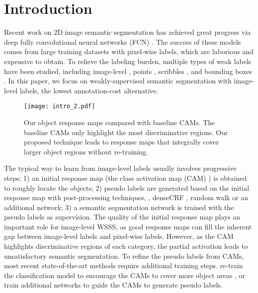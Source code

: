 \documentclass[10pt,twocolumn,letterpaper]{article}
\begin{document}
\section{Introduction}
Recent work on 2D image semantic segmentation has achieved great progress via
deep fully convolutional neural networks (FCN) \cite{long2015fully}. 
The success of these models \cite{zhao2017pyramid,chen2017deeplab,chen2014semantic,zhao2018psanet,chen2017rethinking} comes from large training datasets with pixel-wise labels, which are laborious and expensive to obtain. 
To relieve the labeling burden, multiple types of weak labels have been studied, including image-level \cite{huang2018weakly,wei2018revisiting,ahn2018learning,fan2020cian}, points \cite{bearman2016s},
scribbles \cite{vernaza2017learning,lin2016scribblesup,tang2018regularized}, and bounding boxes \cite{dai2015boxsup,papandreou2015weakly,khoreva2017simple,li2018weakly,song2019box}.
In this paper, we focus on weakly-supervised semantic segmentation with image-level labels, the lowest annotation-cost alternative.


\begin{figure}[t!]
   \begin{center}
   {\texttt{[image: intro\_2.pdf]}}
   \end{center}
\caption{Our  object response maps compared with baseline CAMs. 
The baseline CAMs only highlight the most discriminative regions. 
Our proposed
technique
leads to response maps that 
integrally 
cover larger object regions without re-training.}
\vspace{-5mm}
   \label{fig: introduction}
\end{figure}



The typical way to learn from image-level labels usually involves progressive steps: 1) an initial response map (the class activation map
(CAM) 
\cite{zhou2016learning}) 
is obtained
to roughly locate the objects; 2) 
pseudo labels are generated based on the initial response map with post-processing techniques,
\eg, denseCRF \cite{krahenbuhl2011efficient}, random walk \cite{lovasz1993random} or an additional network\cite{ahn2019weakly, ahn2018learning, wang2018weakly}; 3) a semantic segmentation network is trained
with the pseudo labels as supervision. 
The quality of the initial response map plays an important role
for image-level WSSS,
as good
response maps can
fill the inherent gap between image-level labels and pixel-wise labels.
However,
as the CAM highlights discriminative regions of each category, the partial activation
leads to unsatisfactory semantic segmentation.
To refine the pseudo labels from CAMs, 
most recent state-of-the-art methods require additional training steps.
\ie re-train the classification model to encourage the CAMs to cover more object areas \cite{chang2020mixup, chang2020mixup, wei2018revisiting, sun2020mining, zhang2020splitting, wang2020self}, or train additional networks \cite{ahn2018learning, ahn2019weakly, wang2018weakly} to guide the CAMs to generate pseudo labels.
\end{document}
